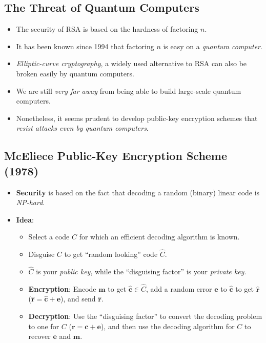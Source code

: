 \subsection*{The Threat of Quantum Computers}
\begin{itemize}
    \item The security of RSA is based on the hardness of factoring $ n $.
    \item It has been known since 1994 that factoring $ n $ is easy
          on a \emph{quantum computer}.
    \item \emph{Elliptic-curve cryptography}, a widely used alternative to
          RSA can also be broken easily by quantum computers.
    \item We are still \emph{very far away} from being able to build
          large-scale quantum computers.
    \item Nonetheless, it seems prudent to develop public-key encryption
          schemes that \emph{resist attacks even by quantum computers}.
\end{itemize}
\subsection*{McEliece Public-Key Encryption Scheme (1978)}
\begin{itemize}
    \item \textbf{Security} is based on the fact that decoding
          a random (binary) linear code is \emph{NP-hard}.
    \item \textbf{Idea}:
          \begin{itemize}
              \item Select a code $ C $ for which an efficient decoding algorithm is known.
              \item Disguise $ C $ to get ``random looking'' code $ \hat{C} $.
              \item $ \hat{C} $ is your \emph{public key}, while the ``disguising factor''
                    is your \emph{private key}.
              \item \textbf{Encryption}: Encode $ \symbf{m} $ to get
                    $ \hat{\symbf{c}}\in\hat{C} $, add a random error $ \symbf{e} $ to
                    $ \hat{\symbf{c}} $ to get $ \hat{\symbf{r}} $ ($ \hat{\symbf{r}}=\hat{\symbf{c}}+\symbf{\symbf{e}} $),
                    and send $ \hat{\symbf{r}} $.
              \item \textbf{Decryption}: Use the ``disguising factor'' to
                    convert the decoding problem to one for $ C $ ($ \symbf{r}=\symbf{c}+\symbf{e} $), and
                    then use the decoding algorithm for $ C $ to recover $ \symbf{e} $ and $ \symbf{m} $.
          \end{itemize}
\end{itemize}
